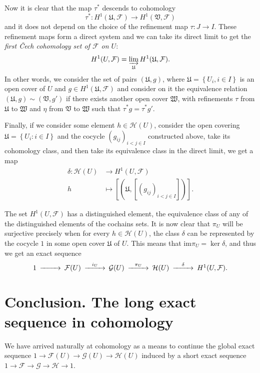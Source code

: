 \documentclass[12pt,a4paper]{article}
\begin{document}
	Now it is clear that the map $\tau^*$ descends to cohomology
	\begin{equation*}
	  \tau^*: H^1(\mathfrak{U},\mathcal{F})\rightarrow H^1(\mathfrak{V},\mathcal{F})
	\end{equation*}
	and it does not depend on the choice of the refinement map $\tau:J \rightarrow I$. These refinement maps form a direct system and we can take its direct limit to get the \emph{first \v{C}ech cohomology set of $\mathcal{F}$ on $U$}:
	\begin{equation*}
	  H^1(U,\mathcal{F})=\varinjlim_{\mathfrak{U}} H^1(\mathfrak{U},\mathcal{F}).
	\end{equation*}
	In other words, we consider the set of pairs $(\mathfrak{U},g)$, where $\mathfrak{U}=\left\{ U_i,i\in I \right\}$ is an open cover of $U$ and $g\in H^1(\mathfrak{U},\mathcal{F})$ and consider on it the equivalence relation $(\mathfrak{U},g)\sim (\mathfrak{V},g')$ if there exists another open cover $\mathfrak{W}$, with refinements $\tau$ from $\mathfrak{U}$ to $\mathfrak{W}$ and $\eta$ from $\mathfrak{V}$ to $\mathfrak{W}$ such that $\tau^*g=\tau^*g'$.

	Finally, if we consider some element $h\in \mathcal{H}(U)$, consider the open covering $\mathfrak{U}=\left\{ U_i:i\in I \right\}$ and the cocycle $(g_{ij})_{i<j\in I}$ constructed above, take its cohomology class, and then take its equivalence class in the direct limit, we get a map
	\begin{align*}
	  \delta:\mathcal{H}(U)&\longrightarrow H^1(U,\mathcal{F})\\ 
	  h &\longmapsto [(\mathfrak{U},[(g_{ij})_{i<j\in I}])]. 
	  \end{align*}

	  The set $H^1(U,\mathcal{F})$ has a distinguished element, the equivalence class of any of the distinguished elements of the cochains sets. It is now clear that $\pi_U$ will be surjective precisely when for every $h\in \mathcal{H}(U)$, the class $\delta$ can be represented by the cocycle $1$ in some open cover $\mathfrak{U}$ of $U$. This means that $\mathrm{im} \pi_U=\ker \delta$, and thus we get an exact sequence
	  \begin{equation*}
      \begin{CD}
	1 @>>>	\mathcal{F}(U) @> i_U >> \mathcal{G}(U) @> \pi_U >> \mathcal{H}(U) @>\delta >> H^1(U,\mathcal{F}).
      \end{CD}
	  \end{equation*}

	  \section*{Conclusion. The long exact sequence in cohomology}
	  We have arrived naturally at cohomology as a means to continue the global exact sequence $1\rightarrow \mathcal{F}(U) \rightarrow \mathcal{G}(U) \rightarrow \mathcal{H}(U)$ induced by a short exact sequence $1\rightarrow \mathcal{F} \rightarrow \mathcal{G} \rightarrow \mathcal{H}\rightarrow 1$.
\end{document}
